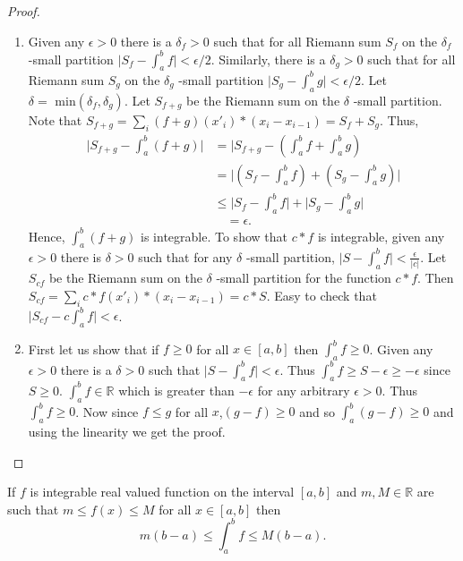 \begin{proof}
    \begin{enumerate}
	\item Given any $\epsilon > 0$ there is a $\delta_f > 0$ such that for all Riemann sum $S_f$
	    on the $\delta_{f}$ -small partition $\lvert S_f - \int_a^b f\rvert < \epsilon/2$.
	    Similarly, there is a $\delta_{g} > 0$ such that for all Riemann sum $S_g$ on the
	    $\delta_{g}$ -small partition $\lvert S_g - \int_a^b g\rvert < \epsilon/2$. Let $\delta
	    = \text{ min}(\delta_{f},\delta_{g})$. Let $S_{f+g}$ be the Riemann sum on the $\delta$
	    -small partition. Note that  $S_{f+g} = \sum_{i}(f+g)(x'_i)*(x_{i} - x_{i-1}) = S_f +
	    S_g$. Thus,
	    \begin{displaymath}
		\begin{aligned}
		     \lvert S_{f+g}-\int_a^b(f+g) \rvert & =  \lvert S_{f+g} - (\int_a^b f+\int_a^b
		     g) \\
		     & = \lvert (S_f - \int_a^b f) + (S_g - \int_a^b g) \rvert \\
		     &\leq \lvert S_f - \int_a^b f \rvert + \lvert S_g - \int_a^b g \rvert \\
		     & \quad = \epsilon.
		\end{aligned}
	    \end{displaymath}	
	    Hence, $\int_a^b (f+g)$ is integrable.
	    To show that $c*f$ is integrable, given any $\epsilon > 0$ there is $\delta > 0$ such
	    that for any $\delta$ -small partition, $\lvert S - \int_a^b f \rvert <
	    \frac{\epsilon}{\lvert c \rvert}$.  Let $S_{cf}$ be the
	    Riemann sum on the $\delta$ -small partition for the function $c*f$. Then $S_{cf} =
	    \sum_i c*f(x'_i)*(x_i - x_{i-1}) = c*S$. Easy to check that $\lvert S_{cf} - c\int_a^b
	    f\rvert < \epsilon$.
	\item First let us show that if $f \geq 0$ for all $x \in \left[a,b\right]$ then $\int_a^b f
	\geq 0$. Given any $\epsilon > 0$ there is a $\delta > 0$ such that $\lvert S - \int_a^b f
	\rvert < \epsilon$. Thus $\int_a^bf \geq S - \epsilon \geq -\epsilon$ since $S \geq 0$.
	$\int_a^b f \in \mathbb{R}$ which is greater than $-\epsilon $ for any arbitrary $\epsilon >
	0$. Thus $\int_a^b f \geq 0$. Now since $f \leq g$ for all $x$,$(g-f) \geq 0$ and so
	$\int_a^b(g-f) \geq 0$ and using the linearity we get the proof.
    \end{enumerate}
\end{proof}
\begin{Corollary}
If $f$ is integrable real valued function on the interval $\left[a,b\right]$ and $m,M \in
\mathbb{R}$ are such that $m \leq f(x) \leq M$ for all $x \in \left[a,b\right]$ then 
\[ m(b-a) \leq \int_a^b f \leq M(b-a). \]
\end{Corollary}
